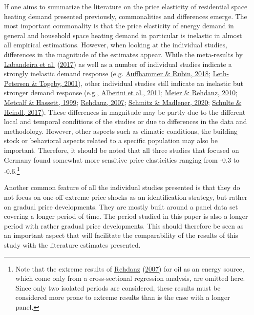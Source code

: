 \documentclass[12pt,twoside]{reedthesis}
\begin{document}
If one aims to summarize the literature on the price elasticity of residential space heating demand presented previously, commonalities and differences emerge. The most important commonality is that the price elasticity of energy demand in general and household space heating demand in particular is inelastic in almost all empirical estimations. However, when looking at the individual studies, differences in the magnitude of the estimates appear. While the meta-results by \protect\hyperlink{ref-labandeira_etal17}{Labandeira et al.} (\protect\hyperlink{ref-labandeira_etal17}{2017}) as well as a number of individual studies indicate a strongly inelastic demand response (e.g. \protect\hyperlink{ref-auffhammer_rubin18}{Auffhammer \& Rubin, 2018}; \protect\hyperlink{ref-leth-petersen_togeby01}{Leth-Petersen \& Togeby, 2001}), other individual studies still indicate an inelastic but stronger demand response (e.g., \protect\hyperlink{ref-alberini_etal11}{Alberini et al., 2011}; \protect\hyperlink{ref-meier_rehdanz10}{Meier \& Rehdanz, 2010}; \protect\hyperlink{ref-metcalf_hassett99}{Metcalf \& Hassett, 1999}; \protect\hyperlink{ref-rehdanz07}{Rehdanz, 2007}; \protect\hyperlink{ref-schmitz_madlener20}{Schmitz \& Madlener, 2020}; \protect\hyperlink{ref-schulte_heindl17}{Schulte \& Heindl, 2017}). These differences in magnitude may be partly due to the different local and temporal conditions of the studies or due to differences in the data and methodology. However, other aspects such as climatic conditions, the building stock or behavioral aspects related to a specific population may also be important. Therefore, it should be noted that all three studies that focused on Germany found somewhat more sensitive price elasticities ranging from -0.3 to -0.6.\footnote{Note that the extreme results of \protect\hyperlink{ref-rehdanz07}{Rehdanz} (\protect\hyperlink{ref-rehdanz07}{2007}) for oil as an energy source, which come only from a cross-sectional regression analysis, are omitted here. Since only two isolated periods are considered, these results must be considered more prone to extreme results than is the case with a longer panel.}

Another common feature of all the individual studies presented is that they do not focus on one-off extreme price shocks as an identification strategy, but rather on gradual price developments. They are mostly built around a panel data set covering a longer period of time. The period studied in this paper is also a longer period with rather gradual price developments. This should therefore be seen as an important aspect that will facilitate the comparability of the results of this study with the literature estimates presented.
\end{document}
